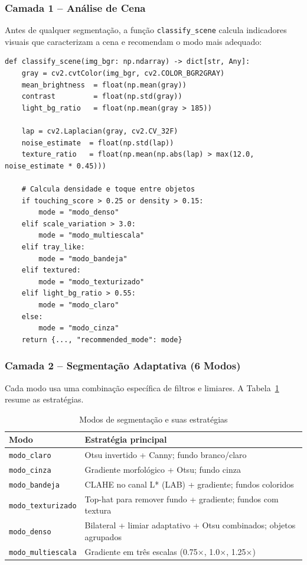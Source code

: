 \documentclass[12pt,a4paper]{article}
\begin{document}
\subsubsection{Camada 1 -- An\'alise de Cena}

Antes de qualquer segmenta\c{c}\~ao, a fun\c{c}\~ao \texttt{classify\_scene} calcula
indicadores visuais que caracterizam a cena e recomendam o modo mais adequado:

\begin{lstlisting}[caption={An\'alise de cena para escolha autom\'atica de modo}]
def classify_scene(img_bgr: np.ndarray) -> dict[str, Any]:
    gray = cv2.cvtColor(img_bgr, cv2.COLOR_BGR2GRAY)
    mean_brightness  = float(np.mean(gray))
    contrast         = float(np.std(gray))
    light_bg_ratio   = float(np.mean(gray > 185))

    lap = cv2.Laplacian(gray, cv2.CV_32F)
    noise_estimate  = float(np.std(lap))
    texture_ratio   = float(np.mean(np.abs(lap) > max(12.0, noise_estimate * 0.45)))

    # Calcula densidade e toque entre objetos
    if touching_score > 0.25 or density > 0.15:
        mode = "modo_denso"
    elif scale_variation > 3.0:
        mode = "modo_multiescala"
    elif tray_like:
        mode = "modo_bandeja"
    elif textured:
        mode = "modo_texturizado"
    elif light_bg_ratio > 0.55:
        mode = "modo_claro"
    else:
        mode = "modo_cinza"
    return {..., "recommended_mode": mode}
\end{lstlisting}

\subsubsection{Camada 2 -- Segmenta\c{c}\~ao Adaptativa (6 Modos)}

Cada modo usa uma combina\c{c}\~ao espec\'ifica de filtros e limiares. A
Tabela~\ref{tab:modos} resume as estrat\'egias.

\begin{table}[H]
  \centering
  \caption{Modos de segmenta\c{c}\~ao e suas estrat\'egias}
  \label{tab:modos}
  \begin{tabular}{lp{9cm}}
    \toprule
    \textbf{Modo} & \textbf{Estrat\'egia principal} \\
    \midrule
    \texttt{modo\_claro}       & Otsu invertido + Canny; fundo branco/claro \\
    \texttt{modo\_cinza}       & Gradiente morfol\'ogico + Otsu; fundo cinza \\
    \texttt{modo\_bandeja}     & CLAHE no canal L* (LAB) + gradiente; fundos coloridos \\
    \texttt{modo\_texturizado} & Top-hat para remover fundo + gradiente; fundos com textura \\
    \texttt{modo\_denso}       & Bilateral + limiar adaptativo + Otsu combinados; objetos agrupados \\
    \texttt{modo\_multiescala} & Gradiente em tr\^es escalas (0.75$\times$, 1.0$\times$, 1.25$\times$) \\
    \bottomrule
  \end{tabular}
\end{table}
\end{document}

